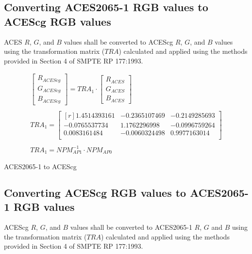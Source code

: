 \subsection{Converting ACES2065-1 RGB values to ACEScg RGB values}
\label{sec:aces2acescg}
ACES $R$, $G$, and $B$ values shall be converted to ACEScg $R$, $G$, and $B$ values using the transformation matrix ($TRA$) calculated and applied using the methods provided in Section 4 of SMPTE RP 177:1993.


\begin{floatequ} 
\begin{gather}
    \begin{bmatrix}
        R_{ACEScg}\\
        G_{ACEScg}\\
        B_{ACEScg}
    \end{bmatrix}
    =
    TRA_{1}
    \cdot
    \begin{bmatrix}
        R_{ACES}\\
        G_{ACES}\\
        B_{ACES}
    \end{bmatrix} \\
    \\
    TRA_{1} =
    \begin{bmatrix*}[r]
        1.4514393161 & -0.2365107469 & -0.2149285693 \\
       -0.0765537734 &  1.1762296998 & -0.0996759264 \\
        0.0083161484 & -0.0060324498 &  0.9977163014 \\
    \end{bmatrix*} \\
    \\
    TRA_{1} = NPM^{-1}_{AP1} \cdot NPM_{AP0}
\end{gather}
\caption{ACES2065-1 to ACEScg}
\label{eq:aces2acescg}
\end{floatequ}

\subsection{Converting ACEScg RGB values to ACES2065-1 RGB values}
ACEScg $R$, $G$, and $B$ values shall be converted to ACES2065-1 $R$, $G$ and $B$ using the transformation matrix ($TRA$) calculated and applied using the methods provided in Section 4 of SMPTE RP 177:1993.

